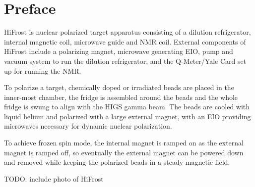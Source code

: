 \chapter*{Preface}
\thispagestyle{empty} 


HiFrost is nuclear polarized target apparatus consisting of a dilution refrigerator, internal magnetic coil, microwave guide and NMR coil.  External components of HiFrost include a polarizing magnet, microwave generating EIO, pump and vacuum system to run the dilution refrigerator, and the Q-Meter/Yale Card set up for running the NMR. 


To polarize a target, chemically doped or irradiated beads are placed in the inner-most chamber, the fridge is assembled around the beads and the whole fridge is swung to align with the HIGS gamma beam.  The beads are cooled with liquid helium and polarized with a large external magnet, with an EIO providing microwaves necessary for dynamic nuclear polarization.


To achieve frozen spin mode, the internal magnet is ramped on as the external magnet is ramped off, so eventually the external magnet can be powered down and removed while keeping the polarized beads in a steady magnetic field.

TODO: include photo of HiFrost